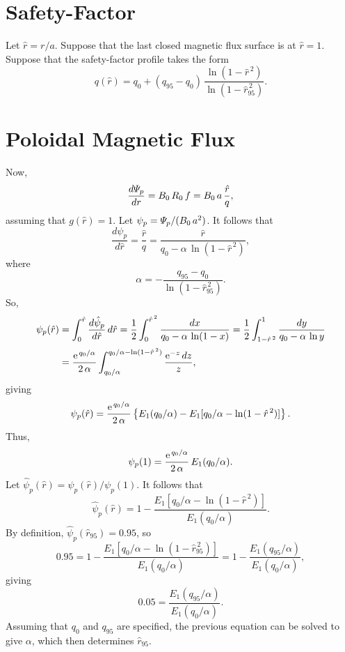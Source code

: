 \documentclass[12pt,prb,aps]{revtex4-1}
\begin{document}
\section{Safety-Factor}
Let $\hat{r}=r/a$. Suppose that the last closed magnetic flux surface is at $\hat{r}=1$. Suppose that the safety-factor profile takes the
form
\begin{equation}
q(\hat{r}) = q_0 + (q_{95}-q_0)\,\frac{\ln(1-\hat{r}^{\,2})}{\ln(1-\hat{r}_{95}^{\,2})}.
\end{equation}

\section{Poloidal Magnetic Flux}
Now,
\begin{equation}
\frac{d{\mit\Psi}_p}{dr} = B_0\,R_0\,f = B_0\,a\,\frac{\hat{r}}{q},
\end{equation}
assuming that $g(\hat{r})=1$. Let $\psi_p = {\mit\Psi}_p/(B_0\,a^2)$. It follows that
\begin{equation}
\frac{d\psi_p}{d\hat{r}} = \frac{\hat{r}}{q}=\frac{\hat{r}}{q_0-\alpha\,\ln(1-\hat{r}^{\,2})},
\end{equation}
where
\begin{equation}
\alpha = -\frac{q_{95}-q_0}{\ln(1-\hat{r}_{95}^{\,2})}.
\end{equation}
So,
\begin{align}
\psi_p(\hat{r})&=\int_0^{\hat{r}}\frac{d\hat{\psi}_p}{d\hat{r}}\,d\hat{r} = \frac{1}{2}\int_0^{\hat{r}^{\,2}}\frac{dx}{q_0 -\alpha\,\ln(1-x)} = \frac{1}{2}\int_{1-\hat{r}^{\,2}}^1\frac{dy}{q_0-\alpha\,\ln y}\nonumber\\[0.5ex]
&=
\frac{{\rm e}^{\,q_0/\alpha}}{2\,\alpha}\int^{q_0/\alpha-\ln(1-\hat{r}^{\,2})}_{q_0/\alpha}\frac{{\rm e}^{-z}\,dz}{z},
\end{align}
giving
\begin{equation}
\psi_p(\hat{r}) = \frac{{\rm e}^{\,q_0/\alpha}}{2\,\alpha}\left\{E_1(q_0/\alpha)-E_1[q_0/\alpha-\ln(1-\hat{r}^{\,2})]\right\}.
\end{equation}
Thus,
\begin{equation}
\psi_p(1) =  \frac{{\rm e}^{\,q_0/\alpha}}{2\,\alpha}\,E_1(q_0/\alpha).
\end{equation}
Let $\hat{\psi}_p(\hat{r})=\psi_p(\hat{r})/\psi_p(1)$. It follows that
\begin{equation}
\hat{\psi}_p(\hat{r})= 1- \frac{E_1[q_0/\alpha-\ln(1-\hat{r}^{\,2})]}{E_1(q_0/\alpha)}.
\end{equation}
By definition, $\hat{\psi}_p(\hat{r}_{95}) = 0.95$, so 
\begin{equation}
0.95 = 1- \frac{E_1[q_0/\alpha-\ln(1-\hat{r}_{95}^{\,2})]}{E_1(q_0/\alpha)}= 1- \frac{E_1(q_{95}/\alpha)}{E_1(q_0/\alpha)},
\end{equation}
giving
\begin{equation}
0.05 = \frac{E_1(q_{95}/\alpha)}{E_1(q_0/\alpha)}.
\end{equation}
Assuming that $q_0$ and $q_{95}$ are specified, the  previous equation can be solved to give $\alpha$, which then determines $\hat{r}_{95}$. 
\end{document}

